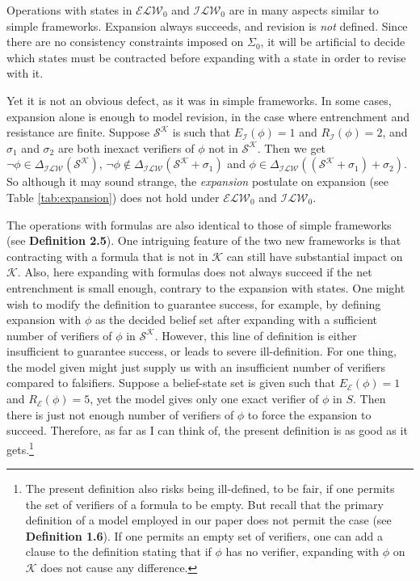 \documentclass[12pt]{article}
\newcommand{\K}{\mathcal{K}}
\newcommand{\SK}{\mathcal{S}^\mathcal{K}}
\begin{document}
Operations with states in $\mathcal{ELW}_0$ and $\mathcal{ILW}_0$ are in many aspects similar to simple frameworks. Expansion always succeeds, and revision is \textit{not} defined. Since there are no consistency constraints imposed on $\Sigma_0$, it will be artificial to decide which states must be contracted before expanding with a state in order to revise with it. 
\par
Yet it is not an obvious defect, as it was in simple frameworks. In some cases, expansion alone is enough to model revision, in the case where entrenchment and resistance are finite. Suppose $\SK$ is such that $E_\mathcal{I}(\phi) = 1$ and $R_\mathcal{I}(\phi) = 2$, and $\sigma_1$ and $\sigma_2$ are both inexact verifiers of $\phi$ not in $\SK$. Then we get $\lnot \phi \in \Delta_\mathcal{ILW}(\SK)$, $\lnot \phi \notin \Delta_\mathcal{ILW}(\SK + \sigma_1)$ and $\phi \in \Delta_\mathcal{ILW}((\SK + \sigma_1) + \sigma_2)$. So although it may sound strange, the \textit{expansion} postulate on expansion (see Table \ref{tab:expansion}) does not hold under $\mathcal{ELW}_0$ and $\mathcal{ILW}_0$. 
\par
The operations with formulas are also identical to those of simple frameworks (see \textbf{Definition 2.5}). One intriguing feature of the two new frameworks is that contracting with a formula that is not in $\K$ can still have substantial impact on $\K$. Also, here expanding with formulas does not always succeed if the net entrenchment is small enough, contrary to the expansion with states. One might wish to modify the definition to guarantee success, for example, by defining expansion with $\phi$ as the decided belief set after expanding with a sufficient number of verifiers of $\phi$ in $\SK$. However, this line of definition is either insufficient to guarantee success, or leads to severe ill-definition. For one thing, the model given might just supply us with an insufficient number of verifiers compared to falsifiers. Suppose a belief-state set is given such that $E_\mathcal{E}(\phi) = 1$ and $R_\mathcal{E}(\phi) = 5$, yet the model gives only one exact verifier of $\phi$ in $S$. Then there is just not enough number of verifiers of $\phi$ to force the expansion to succeed. Therefore, as far as I can think of, the present definition is as good as it gets.\footnote{The present definition also risks being ill-defined, to be fair, if one permits the set of verifiers of a formula to be empty. But recall that the primary definition of a model employed in our paper does not permit the case (see \textbf{Definition 1.6}). If one permits an empty set of verifiers, one can add a clause to the definition stating that if $\phi$ has no verifier, expanding with $\phi$ on $\K$ does not cause any difference.} 
\end{document}
